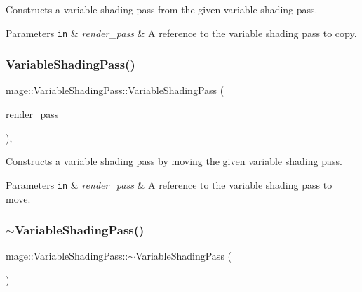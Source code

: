 Constructs a variable shading pass from the given variable shading pass.


\begin{DoxyParams}[1]{Parameters}
\mbox{\tt in}  & {\em render\+\_\+pass} & A reference to the variable shading pass to copy. \\
\hline
\end{DoxyParams}
\hypertarget{classmage_1_1_variable_shading_pass_a214cdbab6685f4fc63130979cc247765}{}\label{classmage_1_1_variable_shading_pass_a214cdbab6685f4fc63130979cc247765} 
\subsubsection{\texorpdfstring{Variable\+Shading\+Pass()}{VariableShadingPass()}\hspace{0.1cm}{\footnotesize\ttfamily [3/3]}}
{\footnotesize\ttfamily mage\+::\+Variable\+Shading\+Pass\+::\+Variable\+Shading\+Pass (\begin{DoxyParamCaption}\item[{\hyperlink{classmage_1_1_variable_shading_pass}{Variable\+Shading\+Pass} \&\&}]{render\+\_\+pass }\end{DoxyParamCaption})\hspace{0.3cm}{\ttfamily [default]}, {\ttfamily [noexcept]}}

Constructs a variable shading pass by moving the given variable shading pass.


\begin{DoxyParams}[1]{Parameters}
\mbox{\tt in}  & {\em render\+\_\+pass} & A reference to the variable shading pass to move. \\
\hline
\end{DoxyParams}
\hypertarget{classmage_1_1_variable_shading_pass_a1af7915285b239e8e6d14eb0f926dc4a}{}\label{classmage_1_1_variable_shading_pass_a1af7915285b239e8e6d14eb0f926dc4a} 
\subsubsection{\texorpdfstring{$\sim$\+Variable\+Shading\+Pass()}{~VariableShadingPass()}}
{\footnotesize\ttfamily mage\+::\+Variable\+Shading\+Pass\+::$\sim$\+Variable\+Shading\+Pass (\begin{DoxyParamCaption}{ }\end{DoxyParamCaption})\hspace{0.3cm}{\ttfamily [default]}}

